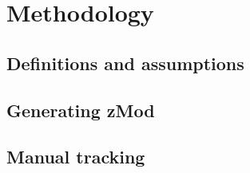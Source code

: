 
\chapter{Methodology}

\ifpdf
    \graphicspath{{Chapter4/Figs/Raster/}{Chapter4/Figs/PDF/}{Chapter4/Figs/}}
\else
    \graphicspath{{Chapter4/Figs/Vector/}{Chapter4/Figs/}}
\fi

\section{Definitions and assumptions}



\section{Generating zMod}



\section{Manual tracking}

